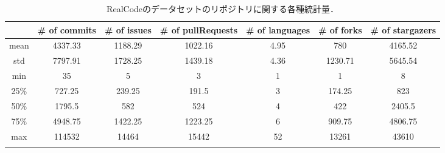 \begin{table}[!b]
  \small
  \centering
  \caption{RealCodeのデータセットのリポジトリに関する各種統計量．}
  \label{table:stats_repos}
  \begin{tabular}{c || c | c | c | c | c | c} \Xhline{3\arrayrulewidth}
        & \# of commits & \# of issues & \# of pullRequests & \# of languages & \# of forks & \# of stargazers \\ \hline
        mean & 4337.33 & 1188.29 & 1022.16 & 4.95 & 780 & 4165.52 \\
        std & 7797.91 & 1728.25 & 1439.18 & 4.36 & 1230.71 & 5645.54 \\
        min & 35 & 5 & 3 & 1 & 1 & 8 \\
        25\% & 727.25 & 239.25 & 191.5 & 3 & 174.25 & 823 \\
        50\% & 1795.5 & 582 & 524 & 4 & 422 & 2405.5 \\
        75\% & 4948.75 & 1422.25 & 1223.25 & 6 & 909.75 & 4806.75 \\
        max & 114532 & 14464 & 15442 & 52 & 13261 & 43610 \\
    \Xhline{3\arrayrulewidth}
\end{tabular}
\end{table}


